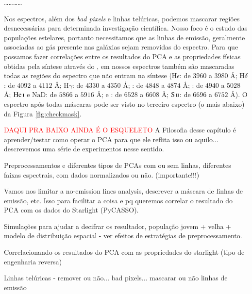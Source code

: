 \ldots \dots \ldots \ldots

Nos espectros, além dos {\em bad pixels} e linhas telúricas, podemos mascarar regiões desnecessárias para determinada
investigação científica. Nosso foco é o estudo das populações estelares, portanto necessitamos que as linhas de emissão,
geralmente associadas ao gás presente nas galáxias \fixme sejam removidas do espectro. Para que possamos fazer
correlações entre os resultados do PCA e as propriedades físicas obtidas pela síntese através do \starlight, em nossos
espectros também são mascaradas todas as regiões do espectro que não entram na síntese ($\mathrm{H}\epsilon$: de $3960$
a $3980$ \AA; $\mathrm{H}\delta$: de $4092$ a $4112$ \AA; $\mathrm{H}\gamma$: de $4330$ a $4350$ \AA; \Hbeta: de $4848$
a $4874$ \AA; \oIII: de $4940$ a $5028$ \AA; $\mathrm{He\,\textsc{i}}$ e $\mathrm{NaD}$: de $5866$ a $5916$ \AA; \Halpha
e \nII: de $6528$ a $6608$ \AA; $\mathrm{S\,\textsc{ii}}$: de $6696$ a $6752$ \AA). O espectro após todas máscaras pode
ser visto no terceiro espectro (o mais abaixo) da Figura \ref{fig:checkmask}.


\textcolor{red}{DAQUI PRA BAIXO AINDA É O ESQUELETO}
\ojo A Filosofia desse capítulo é aprender/testar como operar o PCA para que ele
reflita isso ou aquilo... descrevemos uma série de experimentos nesse sentido.

Preprocessamentos e diferentes tipos de PCAs com ou sem linhas, diferentes
faixas espectrais, com dados normalizados ou não. (importante!!!)

Vamos nos limitar a no-emission lines analysis, descrever a máscara de linhas de
emissão, etc. Isso para facilitar a coisa e pq queremos correlar o resultado do
PCA com os dados do Starlight (PyCASSO).

Simulações para ajudar a decifrar os resultador, população jovem + velha +
modelo de distribuição espacial - ver efeitos de estratégias de
preprocessamento.

Correlacionando os resultados do PCA com as propriedades do starlight (tipo de
engenharia reversa)

Linhas telúricas - remover ou não... bad pixels... mascarar ou não linhas de
emissão